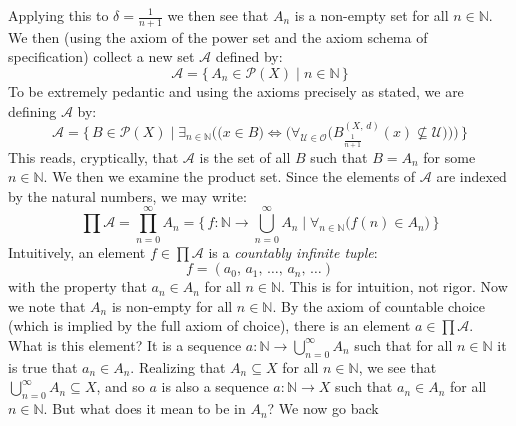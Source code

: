 \documentclass{article}
\theoremstyle{normal}
\begin{document}
    Applying this to $\delta=\frac{1}{n+1}$ we then see that $A_{n}$ is a
    non-empty set for all $n\in\mathbb{N}$. We then (using the axiom of the
    power set and the axiom schema of specification) collect a new set
    $\mathcal{A}$ defined by:
    \begin{equation}
        \mathcal{A}=\{\,A_{n}\in\mathcal{P}(X)\;|\;n\in\mathbb{N}\,\}
    \end{equation}
    To be extremely pedantic and using the axioms precisely as stated, we
    are defining $\mathcal{A}$ by:
    \begin{equation}
        \mathcal{A}=\bigg\{\,B\in\mathcal{P}(X)\;\Big|\;
            \exists_{n\in\mathbb{N}}\bigg(
                \big(x\in{B}\big)\Leftrightarrow\Big(
                    \forall_{\mathcal{U}\in\mathcal{O}}
                    \big(B_{\frac{1}{n+1}}^{(X,\,d)}(x)\nsubseteq\mathcal{U}\big)
                \Big)
            \bigg)\,
        \bigg\}
    \end{equation}
    This reads, cryptically, that $\mathcal{A}$ is the set of all
    $B$ such that $B=A_{n}$ for some $n\in\mathbb{N}$.
    We then we examine the product set. Since the elements of
    $\mathcal{A}$ are indexed by the natural numbers, we may write:
    \begin{equation}
        \prod\mathcal{A}=\prod_{n=0}^{\infty}A_{n}
            =\big\{\,f:\mathbb{N}\rightarrow\bigcup_{n=0}^{\infty}A_{n}\;|\;
                \forall_{n\in\mathbb{N}}\big(f(n)\in{A}_{n}\big)\,\big\}
    \end{equation}
    Intuitively, an element $f\in\prod\mathcal{A}$ is a
    \textit{countably infinite tuple}:
    \begin{equation}
        f=(a_{0},\,a_{1},\,\dots,\,a_{n},\,\dots)
    \end{equation}
    with the property that
    $a_{n}\in{A}_{n}$ for all $n\in\mathbb{N}$. This is for intuition, not
    rigor. Now we note that $A_{n}$ is non-empty for all $n\in\mathbb{N}$.
    By the axiom of countable choice (which is implied by the full axiom of
    choice), there is an element $a\in\prod\mathcal{A}$. What is this element?
    It is a sequence $a:\mathbb{N}\rightarrow\bigcup_{n=0}^{\infty}A_{n}$
    such that for all $n\in\mathbb{N}$ it is true that $a_{n}\in{A}_{n}$.
    Realizing that $A_{n}\subseteq{X}$ for all $n\in\mathbb{N}$, we see that
    $\bigcup_{n=0}^{\infty}A_{n}\subseteq{X}$, and so $a$ is also a sequence
    $a:\mathbb{N}\rightarrow{X}$ such that $a_{n}\in{A}_{n}$ for all
    $n\in\mathbb{N}$. But what does it mean to be in $A_{n}$? We now go back
\end{document}
